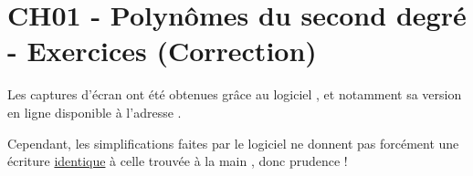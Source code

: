 \documentclass[a4paper,11pt]{article}
\author{Pierquet}
\title{\nomfichier}
\begin{document}
	
\pagestyle{fancy}

\part{CH01 - Polynômes du second degré - Exercices (Correction)}

\begin{clog}
Les captures d'écran ont été obtenues grâce au logiciel , et notamment sa version en ligne disponible à l'adresse .

\smallskip

Cependant, les simplifications faites par le logiciel ne donnent pas forcément une écriture \og \uline{identique} \fg{} à celle trouvée à la main , donc \og prudence \fg{} !
\end{clog}
\end{document}

